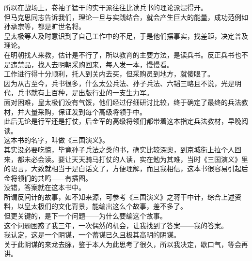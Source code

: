 \begin{multicols}{\theparacolNo}
所以在战场上，卷袖子猛干的实干派往往比读兵书的理论派混得开。\\

但马克思同志告诉我们，理论一旦与实践结合，就会产生巨大的能量，成功范例如孙承宗等，都是旷世名将。\\

皇太极等人及时意识到了自己工作中的不足，于是他们摆事实，找差距，决定普及理论。\\

在明朝找人来教，估计是不行了，所以教育的主要方法，是读兵书。反正兵书也不是违禁品，找人去明朝采购回来，每人发一本，慢慢看。\\

工作进行得十分顺利，托人到关内去买，但采购员到地方，就傻眼了。\\

因为从古至今，兵书很多，什么太公兵法、孙子兵法、六韬三略且不说，光是明代，兵书就有上百种，是出版行业的一支生力军。\\

面对困难，皇太极们没有气馁，他们经过仔细研讨比较，终于确定了最终的兵法教材，并大量采购，保证发到每个高级将领手中。\\

此后无论是行军还是打仗，后金军的高级将领们都带着这本指定兵法教材，早晚阅读。\\

这本书的名字，叫做《三国演义》。\\

其实没必要吃惊，毕竟孙子兵法之类的书，确实比较深奥，到京城街上拉个人回来，都未必会读。要让天天骑马打仗的人读，实在勉为其难，当时《三国演义》里的语言，大致就相当于是白话文了，方便理解，而且我相信，这本书很容易引起后金将领们的共鸣——有插图。\\

没错，答案就在这本书中。\\

所谓反间计的故事，如不知来源，可参考《三国演义》之蒋干中计，综合上述资料，以皇太极们的文化背景，能编出这么个故事，差不多了。\\

但更关键的，是下一个问题——为什么要编这个故事。\\

这个问题困惑了我三年，一次偶然的机会，让我找到了答案——我的答案。\\

我认定，这是一个阴谋，一个蓄谋已久且极其高明的阴谋。\\

关于此阴谋的来龙去脉，鉴于本人为此思考了很久，所以我决定，歇口气，等会再讲。\\


\end{multicols}
